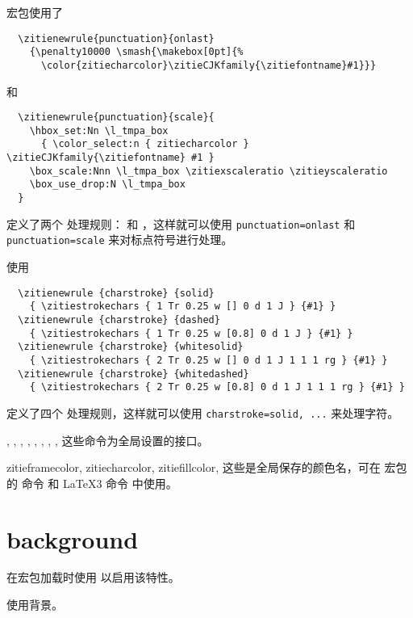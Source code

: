 \documentclass{ctxdoc}
\begin{document}
 宏包使用了
\begin{verbatim}
  \zitienewrule{punctuation}{onlast}
    {\penalty10000 \smash{\makebox[0pt]{%
      \color{zitiecharcolor}\zitieCJKfamily{\zitiefontname}#1}}}
\end{verbatim}
和
\begin{verbatim}
  \zitienewrule{punctuation}{scale}{
    \hbox_set:Nn \l_tmpa_box 
      { \color_select:n { zitiecharcolor } \zitieCJKfamily{\zitiefontname} #1 }
    \box_scale:Nnn \l_tmpa_box \zitiexscaleratio \zitieyscaleratio 
    \box_use_drop:N \l_tmpa_box 
  }
\end{verbatim}
定义了两个  处理规则： 和 ，这样就可以使用 \verb|punctuation=onlast| 和 \verb|punctuation=scale| 来对标点符号进行处理。

使用
\begin{verbatim}
  \zitienewrule {charstroke} {solid}
    { \zitiestrokechars { 1 Tr 0.25 w [] 0 d 1 J } {#1} }
  \zitienewrule {charstroke} {dashed}
    { \zitiestrokechars { 1 Tr 0.25 w [0.8] 0 d 1 J } {#1} }
  \zitienewrule {charstroke} {whitesolid}
    { \zitiestrokechars { 2 Tr 0.25 w [] 0 d 1 J 1 1 1 rg } {#1} }
  \zitienewrule {charstroke} {whitedashed}
    { \zitiestrokechars { 2 Tr 0.25 w [0.8] 0 d 1 J 1 1 1 rg } {#1} }
\end{verbatim}
定义了四个  处理规则，这样就可以使用 \verb|charstroke=solid, ...| 来处理字符。

\begin{function}{
  \zitiewidth,
  \zitieheight,
  \zitieboxwd,
  \zitieboxht,
  \zitieboxdp,
  \zitiefontname,
  \zitiexscaleratio,
  \zitieyscaleratio,
}
  这些命令为全局设置的接口。
\end{function}

\begin{function}{
  zitieframecolor,
  zitiecharcolor,
  zitiefillcolor,
}
  这些是全局保存的颜色名，可在  宏包的  命令 和 \LaTeX3 命令  中使用。
\end{function}


\section{background}\label{sec:background}

在宏包加载时使用  以启用该特性。

\begin{function}{\zitiebackground}
  \begin{syntax}
     
  \end{syntax}
  使用背景。
\end{function}
\end{document}
